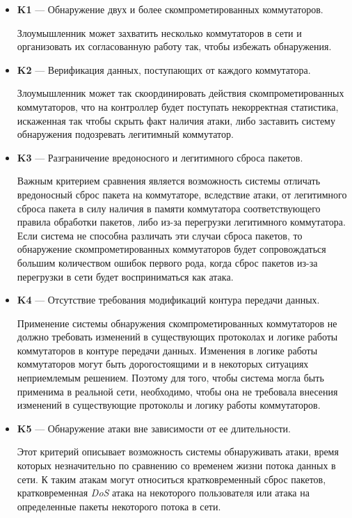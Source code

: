\documentclass[14pt,autoref,href]{disser}
\theoremstyle{definition}
\begin{document}
\begin{itemize}
\item \textbf{K1} --- Обнаружение двух и более скомпрометированных коммутаторов.

Злоумышленник может захватить несколько коммутаторов в сети и организовать их согласованную работу так, чтобы избежать обнаружения.

\item \textbf{K2} --- Верификация данных, поступающих от каждого коммутатора.

Злоумышленник может так скоординировать действия скомпрометированных коммутаторов, что на контроллер будет поступать некорректная статистика, искаженная так чтобы скрыть факт наличия атаки, либо заставить систему обнаружения подозревать легитимный коммутатор.

\item \textbf{K3} --- Разграничение вредоносного и легитимного сброса пакетов.

Важным критерием сравнения является возможность системы отличать вредоносный сброс пакета на коммутаторе, вследствие атаки, от легитимного сброса пакета в силу наличия в памяти коммутатора соответствующего правила обработки пакетов, либо из-за перегрузки легитимного коммутатора.
Если система не способна различать эти случаи сброса пакетов, то обнаружение скомпрометированных коммутаторов будет сопровождаться большим количеством ошибок первого рода, когда сброс пакетов из-за перегрузки в сети будет восприниматься как атака.

\item \textbf{K4} --- Отсутствие требования модификаций контура передачи данных.

Применение системы обнаружения скомпрометированных коммутаторов не должно требовать изменений в существующих протоколах и логике работы коммутаторов в контуре передачи данных.
Изменения в логике работы коммутаторов могут быть дорогостоящими и в некоторых ситуациях неприемлемым решением.
Поэтому для того, чтобы система могла быть применима в реальной сети, необходимо, чтобы она не требовала внесения изменений в существующие протоколы и логику работы коммутаторов.

\item \textbf{K5} --- Обнаружение атаки вне зависимости от ее длительности.

Этот критерий описывает возможность системы обнаруживать атаки, время которых незначительно по сравнению со временем жизни потока данных в сети.
К таким атакам могут относиться кратковременный сброс пакетов, кратковременная \textit{DoS} атака на некоторого пользователя или атака на определенные пакеты некоторого потока в сети.


\end{itemize}
\end{document}
